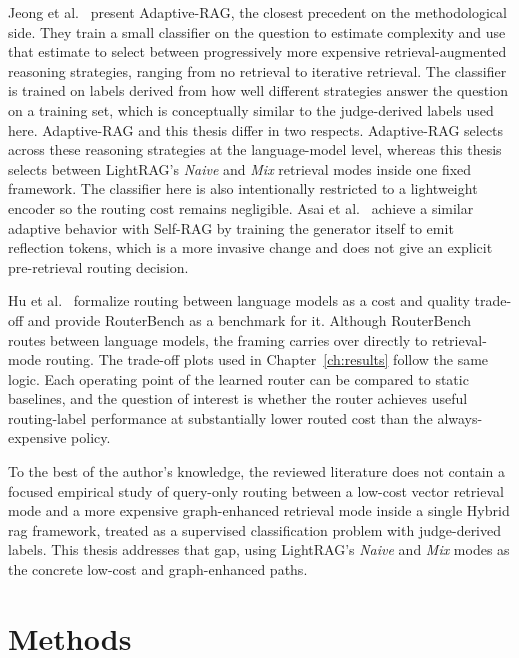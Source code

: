 \documentclass[english, bibtex]{kththesis}               %
\numberwithin{listing}{chapter}
\begin{document}
Jeong et al.\ \cite{jeong2024adaptiverag} present Adaptive-RAG, the closest precedent on the methodological side. They train a small classifier on the question to estimate complexity and use that estimate to select between progressively more expensive retrieval-augmented reasoning strategies, ranging from no retrieval to iterative retrieval. The classifier is trained on labels derived from how well different strategies answer the question on a training set, which is conceptually similar to the judge-derived labels used here. Adaptive-RAG and this thesis differ in two respects. Adaptive-RAG selects across these reasoning strategies at the language-model level, whereas this thesis selects between LightRAG's \emph{Naive} and \emph{Mix} retrieval modes inside one fixed framework. The classifier here is also intentionally restricted to a lightweight encoder so the routing cost remains negligible. Asai et al.\ \cite{asai2023selfrag} achieve a similar adaptive behavior with Self-RAG by training the generator itself to emit reflection tokens, which is a more invasive change and does not give an explicit pre-retrieval routing decision.

Hu et al.\ \cite{hu2024routerbench} formalize routing between language models as a cost and quality trade-off and provide RouterBench as a benchmark for it. Although RouterBench routes between language models, the framing carries over directly to retrieval-mode routing. The trade-off plots used in Chapter~\ref{ch:results} follow the same logic. Each operating point of the learned router can be compared to static baselines, and the question of interest is whether the router achieves useful routing-label performance at substantially lower routed cost than the always-expensive policy.

To the best of the author's knowledge, the reviewed literature does not contain a focused empirical study of query-only routing between a low-cost vector retrieval mode and a more expensive graph-enhanced retrieval mode inside a single Hybrid \gls{rag} framework, treated as a supervised classification problem with judge-derived labels. This thesis addresses that gap, using LightRAG's \emph{Naive} and \emph{Mix} modes as the concrete low-cost and graph-enhanced paths.

\cleardoublepage
\chapter{Methods}
\label{ch:methods}
\end{document}
